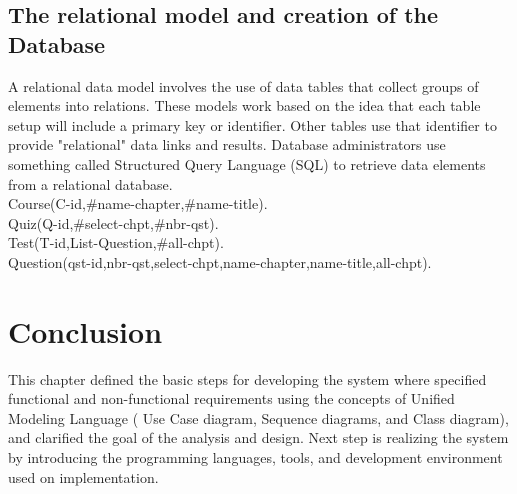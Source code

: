 \subsection{The relational model and creation of the Database}

A relational data model involves the use of data tables that collect groups of elements into relations. These models work based on the idea that each table setup will include a primary key or identifier. Other tables use that identifier to provide "relational" data links and results. Database administrators use something called Structured Query Language (SQL) to retrieve data elements from a relational database.\cite{Techopedia-relational-model} \\
Course(C-id,\#name-chapter,\#name-title).\\
Quiz(Q-id,\#select-chpt,\#nbr-qst).\\
Test(T-id,List-Question,\#all-chpt).\\
Question(qst-id,nbr-qst,select-chpt,name-chapter,name-title,all-chpt).\\


\section{Conclusion}
This chapter defined the basic steps for developing the system where specified functional and
non-functional requirements using the concepts of Unified Modeling Language ( Use Case
diagram, Sequence diagrams, and Class diagram), and clarified the goal of the analysis and
design. Next step is realizing the system
by introducing the programming languages, tools, and development environment used on
implementation.\\







